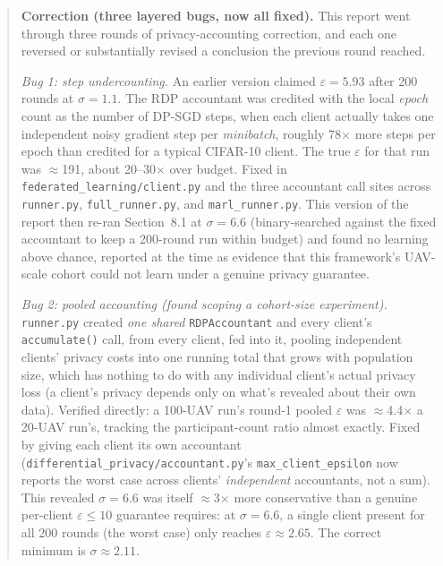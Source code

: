\documentclass[12pt,a4paper]{article}
\begin{document}
\begin{quote}
\noindent\textbf{Correction (three layered bugs, now all fixed).} This
report went through three rounds of privacy-accounting correction, and
each one reversed or substantially revised a conclusion the previous
round reached.

\emph{Bug 1: step undercounting.} An earlier version claimed
$\varepsilon = 5.93$ after 200 rounds at $\sigma = 1.1$. The RDP accountant
was credited with the local \emph{epoch} count as the number of DP-SGD
steps, when each client actually takes one independent noisy gradient step
per \emph{minibatch}, roughly 78$\times$ more steps per epoch than
credited for a typical CIFAR-10 client. The true $\varepsilon$ for that
run was $\approx$191, about 20--30$\times$ over budget. Fixed in
\texttt{federated\_learning/client.py} and the three accountant call sites
across \texttt{runner.py}, \texttt{full\_runner.py}, and
\texttt{marl\_runner.py}. This version of the report then re-ran Section~8.1
at $\sigma = 6.6$ (binary-searched against the fixed accountant to keep a
200-round run within budget) and found no learning above chance,
reported at the time as evidence that this framework's UAV-scale cohort
could not learn under a genuine privacy guarantee.

\emph{Bug 2: pooled accounting (found scoping a cohort-size experiment).}
\texttt{runner.py} created \emph{one shared} \texttt{RDPAccountant} and
every client's \texttt{accumulate()} call, from every client, fed into it,
pooling independent clients' privacy costs into one running total that
grows with population size, which has nothing to do with any individual
client's actual privacy loss (a client's privacy depends only on what's
revealed about their own data). Verified directly: a 100-UAV run's round-1
pooled $\varepsilon$ was $\approx$4.4$\times$ a 20-UAV run's, tracking the
participant-count ratio almost exactly. Fixed by giving each client its
own accountant (\texttt{differential\_privacy/accountant.py}'s
\texttt{max\_client\_epsilon} now reports the worst case across clients'
\emph{independent} accountants, not a sum). This revealed $\sigma=6.6$ was
itself $\approx$3$\times$ more conservative than a genuine per-client
$\varepsilon\le10$ guarantee requires: at $\sigma=6.6$, a single client
present for all 200 rounds (the worst case) only reaches
$\varepsilon\approx2.65$. The correct minimum is $\sigma\approx2.11$.


\end{quote}
\end{document}
